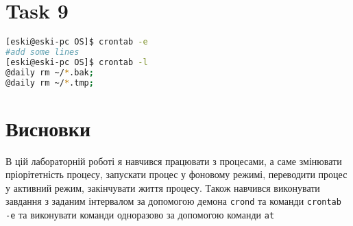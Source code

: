 \documentclass{article}
\begin{document}
	
\section*{Task 9}\vspace{-3mm}
\begin{lstlisting}[language=BASH]
[eski@eski-pc OS]$ crontab -e
#add some lines
[eski@eski-pc OS]$ crontab -l
@daily rm ~/*.bak;
@daily rm ~/*.tmp;
\end{lstlisting}

\vspace{5mm}
\section*{Висновки}
В цій лабораторній роботі я навчився працювати з процесами, а саме змінювати пріорітетність процесу, запускати процес у фоновому режимі, переводити процес у активний режим, закінчувати життя процесу.
Також навчився виконувати завдання з заданим інтервалом за допомогою демона \texttt{crond} та команди \texttt{сrontab -e} та виконувати команди одноразово за допомогою команди \texttt{at}
\end{document}
